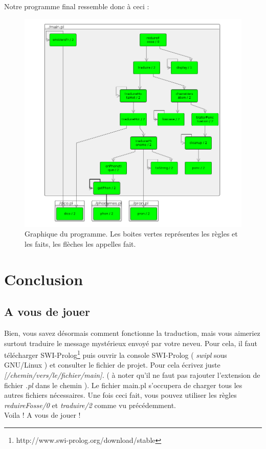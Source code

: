 \documentclass[11pt]{report}
\begin{document}
	Notre programme final ressemble donc à ceci :\\
	\begin{figure}[htp]
	\centering
	\includegraphics[scale=0.60]{mainpl.png}
	\caption{Graphique du programme. Les boites vertes représentes les règles et les faits, les flèches les appelles fait.}
	\end{figure}
 
\chapter{Conclusion}
	\section{A vous de jouer}
	Bien, vous savez désormais comment fonctionne la traduction, mais vous aimeriez surtout traduire le message mystérieux envoyé par votre neveu. Pour cela, il faut télécharger SWI-Prolog\footnote{http://www.swi-prolog.org/download/stable} puis ouvrir la console SWI-Prolog ( {\em swipl} sous GNU/Linux ) et consulter le fichier de projet. Pour cela écrivez juste {\em [/chemin/vers/le/fichier/main].} ( à noter qu'il ne faut pas rajouter l'extension de fichier {\em .pl} dans le chemin ). Le fichier main.pl s'occupera de charger tous les autres fichiers nécessaires. Une fois ceci fait, vous pouvez utiliser les règles {\em reduireFosse/0} et {\em traduire/2} comme vu précédemment.\\
	Voila ! A vous de jouer !
	
\end{document}
